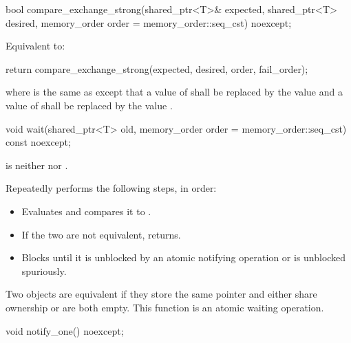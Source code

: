 %
\begin{itemdecl}
bool compare_exchange_strong(shared_ptr<T>& expected, shared_ptr<T> desired,
                             memory_order order = memory_order::seq_cst) noexcept;
\end{itemdecl}

\begin{itemdescr}
\pnum
\effects
Equivalent to:
\begin{codeblock}
return compare_exchange_strong(expected, desired, order, fail_order);
\end{codeblock}
where  is the same as 
except that a value of 
shall be replaced by the value  and
a value of 
shall be replaced by the value .
\end{itemdescr}

%
\begin{itemdecl}
void wait(shared_ptr<T> old, memory_order order = memory_order::seq_cst) const noexcept;
\end{itemdecl}

\begin{itemdescr}
\pnum
\expects
{} is
neither  nor .

\pnum
\effects
Repeatedly performs the following steps, in order:
\begin{itemize}
\item
  Evaluates  and compares it to .
\item
  If the two are not equivalent, returns.
\item
  Blocks until it
  is unblocked by an atomic notifying operation or is unblocked spuriously.
\end{itemize}

\pnum
\remarks
Two  objects are equivalent
if they store the same pointer and either share ownership or are both empty.
This function is an atomic waiting operation.
\end{itemdescr}

%
\begin{itemdecl}
void notify_one() noexcept;
\end{itemdecl}

